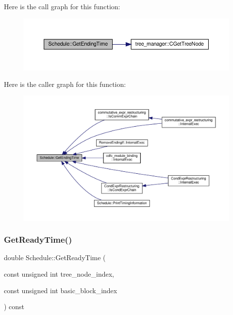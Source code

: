 Here is the call graph for this function\+:
\nopagebreak
\begin{figure}[H]
\begin{center}
\leavevmode
\includegraphics[width=350pt]{df/d61/classSchedule_a964e824c93e67dae2f72137c8a6f2a05_cgraph}
\end{center}
\end{figure}
Here is the caller graph for this function\+:
\nopagebreak
\begin{figure}[H]
\begin{center}
\leavevmode
\includegraphics[width=350pt]{df/d61/classSchedule_a964e824c93e67dae2f72137c8a6f2a05_icgraph}
\end{center}
\end{figure}
\mbox{\label{classSchedule_a8d72a4f687d2af4a664f711c7c192c0e}} 
\subsubsection{\texorpdfstring{Get\+Ready\+Time()}{GetReadyTime()}}
{\footnotesize\ttfamily double Schedule\+::\+Get\+Ready\+Time (\begin{DoxyParamCaption}\item[{const unsigned int}]{tree\+\_\+node\+\_\+index,  }\item[{const unsigned int}]{basic\+\_\+block\+\_\+index }\end{DoxyParamCaption}) const\hspace{0.3cm}{\ttfamily [private]}}



